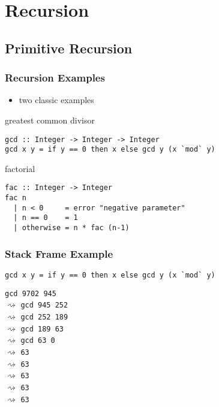 \documentclass[dvipsnames]{beamer}
\theoremstyle{plain}
\begin{document}
\section{Recursion}

\subsection{Primitive Recursion}

\begin{frame}[fragile]
  \frametitle{Recursion Examples}

  \begin{itemize}
    \item two classic examples
  \end{itemize}

  \begin{exampleblock}{greatest common divisor}
    \begin{lstlisting}
gcd :: Integer -> Integer -> Integer
gcd x y = if y == 0 then x else gcd y (x `mod` y)
    \end{lstlisting}
  \end{exampleblock}

  \begin{exampleblock}{factorial}
    \begin{lstlisting}
fac :: Integer -> Integer
fac n
  | n < 0     = error "negative parameter"
  | n == 0    = 1
  | otherwise = n * fac (n-1)
    \end{lstlisting}
  \end{exampleblock}
\end{frame}

\begin{frame}[fragile]
  \frametitle{Stack Frame Example}

  \begin{lstlisting}
gcd x y = if y == 0 then x else gcd y (x `mod` y)
  \end{lstlisting}

  \lstinline{gcd 9702 945}\\
  $\rightsquigarrow$ \lstinline{gcd 945 252}\\
  \hspace{16pt}$\rightsquigarrow$ \lstinline{gcd 252 189}\\
  \hspace{32pt}$\rightsquigarrow$ \lstinline{gcd 189 63}\\
  \hspace{48pt}$\rightsquigarrow$ \lstinline{gcd 63 0}\\
  \hspace{64pt}$\rightsquigarrow$ \lstinline{63}\\
  \hspace{48pt}$\rightsquigarrow$ \lstinline{63}\\
  \hspace{32pt}$\rightsquigarrow$ \lstinline{63}\\
  \hspace{16pt}$\rightsquigarrow$ \lstinline{63}\\
  $\rightsquigarrow$ \lstinline{63}\\
\end{frame}
\end{document}

